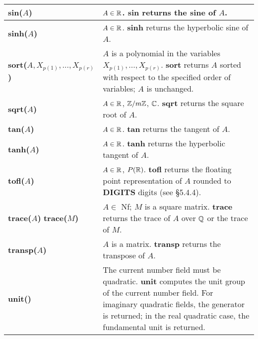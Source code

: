 {\begin{tabular}{|p{1.95in}|p{3.83in}|}
{\bf sin($A$)} &
$A \in \mbox{$\mathbb R$}$.\newline
{\bf sin} returns the sine of $A$.\\ \hline

{\bf sinh($A$)} &
$A \in \mbox{$\mathbb R$}$.\newline
{\bf sinh} returns the hyperbolic sine of $A$.\\ \hline

{\bf sort($A,X_{p(1)} , ... , X_{p(r)}$)} &
$A$ is a polynomial in the variables $X_{p(1)},...,X_{p(r)}$.\newline
{\bf sort} returns $A$ sorted with respect to the specified order
of variables; $A$ is unchanged. \\ \hline

{\bf sqrt($A$)} &
$A \in \mbox{$\mathbb R$}$, $\mbox{$\mathbb Z$}/m\mbox{$\mathbb Z$}$, $\mbox{$\mathbb C$}$.\newline
{\bf sqrt} returns the square root of $A$. \\ \hline

{\bf tan($A$)} &
$A \in \mbox{$\mathbb R$}$.\newline
{\bf tan} returns the tangent of $A$.\\ \hline

{\bf tanh($A$)} &
$A \in \mbox{$\mathbb R$}$.\newline
{\bf tanh} returns the hyperbolic tangent of $A$.\\ \hline

{\bf tofl($A$)} &
$A \in \mbox{$\mathbb R$}$, $P(\mbox{$\mathbb R$})$.\newline
{\bf tofl} returns the floating point representation of $A$ rounded to 
{\bf DIGITS} digits (see \S 5.4.4).\\ \hline

{\bf trace($A$)} \newline
{\bf trace($M$)} &
$A \in$ Nf; $M$ is a square matrix.\newline
{\bf trace} returns the trace of $A$ over $\mbox{$\mathbb Q$}$ or the trace of $M$.\\ \hline

{\bf transp($A$)} &
$A$ is a matrix.\newline
{\bf transp} returns the transpose of $A$.\\ \hline

{\bf unit()} &
The current number field must be quadratic. \newline
{\bf unit} computes the unit group of the current number field. For imaginary
quadratic fields, the generator is returned; in the real quadratic case, the
fundamental unit is returned.\\ \hline
\end{tabular}

}
